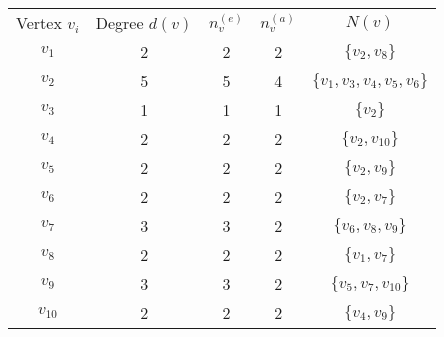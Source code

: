 \begin{table}[ht]
\centering
    \begin{tabular}{c c c c c}
		Vertex $v_{i}$ & Degree $d(v)$ & $n_v^{(e)}$& $n_v^{(a)}$ & $N(v)$\\
		$v_{1}$ & 2 & 2 & 2 & $\{v_2,v_8\}$ \\
		$v_{2}$ & 5 & 5 & 4 & $\{v_1,v_3,v_4,v_5,v_6\}$\\
		$v_{3}$ & 1 & 1 & 1 & $\{v_2\}$\\
		$v_{4}$ & 2 & 2 & 2 & $\{v_2,v_{10}\}$\\
		$v_{5}$ & 2 & 2 & 2 & $\{v_2,v_9\}$\\
		$v_{6}$ & 2 & 2 & 2 & $\{v_2,v_7\}$\\
		$v_{7}$ & 3 & 3 & 2 & $\{v_6,v_8,v_9\}$\\
		$v_{8}$ & 2 & 2 & 2 & $\{v_1,v_7\}$\\
		$v_{9}$ & 3 & 3 & 2 & $\{v_5,v_7,v_{10}\}$\\
		$v_{10}$ & 2 & 2 & 2 & $\{v_4,v_9\}$\\
	\end{tabular}
	\label{viradstable}
\end{table}
\newpage
